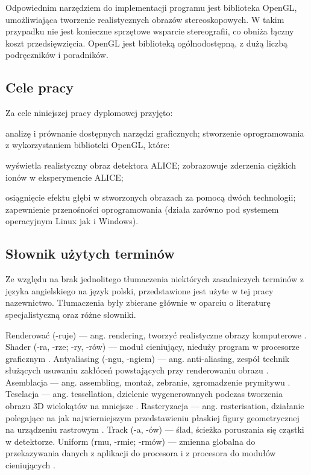 Odpowiednim narzędziem do implementacji programu jest biblioteka OpenGL, umożliwiająca tworzenie realistycznych obrazów stereoskopowych. W takim przypadku nie jest konieczne sprzętowe wsparcie stereografii, co obniża łączny koszt przedsięwzięcia. OpenGL jest biblioteką ogólnodostępną, z dużą liczbą podręczników i poradników.  

\subsection{Cele pracy}
Za cele niniejszej pracy dyplomowej przyjęto:
\begin{itemize}
\itemi analizę i prównanie dostępnych narzędzi graficznych;
\itemi stworzenie oprogramowania z wykorzystaniem biblioteki OpenGL, które:
	\begin{itemize}
	\itemii wyświetla realistyczny obraz detektora ALICE;
	\itemii zobrazowuje zderzenia ciężkich ionów w eksperymencie ALICE;
	\end{itemize}
\itemi osiągnięcie efektu głębi w stworzonych obrazach za pomocą dwóch technologii;
\itemi zapewnienie przenośności oprogramowania (działa zarówno pod systemem operacyjnym Linux jak i Windows).
\end{itemize}

\subsection{Słownik użytych terminów}
Ze względu na brak jednolitego tłumaczenia niektórych zasadniczych terminów z języka angielskiego na język polski, przedstawione jest użyte w tej pracy nazewnictwo. Tłumaczenia były zbierane głównie w oparciu o literaturę specjalistyczną oraz różne słowniki.
\begin{itemize}
\itemi Renderować (-ruje) --- ang. rendering, tworzyć realistyczne obrazy komputerowe \cite{pwn}.
\itemi Shader (-ra, -rze; -ry, -rów) --- moduł cieniujący, nieduży program w procesorze graficznym \cite{slownik}.
\itemi Antyaliasing (-ngu, -ngiem)  --- ang. anti-aliasing, zespół technik służących usuwaniu zakłóceń powstających przy renderowaniu obrazu \cite{wprowadzeniedografiki}.
\itemi Asemblacja --- ang. assembling, montaż, zebranie, zgromadzenie prymitywu \cite{slownik}.
\itemi Teselacja --- ang. tessellation, dzielenie wygenerowanych podczas tworzenia obrazu 3D wielokątów na mniejsze \cite{slownik}.
\itemi Rasteryzacja --- ang. rasterisation, działanie polegające na jak najwierniejszym przedstawieniu płaskiej figury geometrycznej na urządzeniu rastrowym \cite{slownik}.
\itemi Track (-a, -ów) --- ślad, ścieżka poruszania się cząstki w detektorze.
\itemi Uniform (rmu, -rmie; -rmów) --- zmienna globalna do przekazywania danych z aplikacji do procesora i z procesora do modułów cieniujących \cite{slownik}.
\end{itemize}

